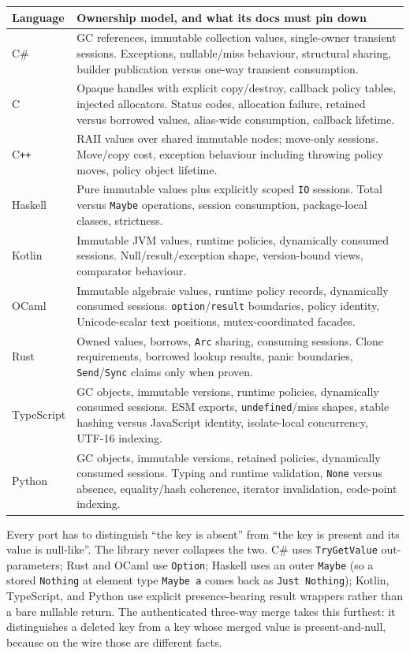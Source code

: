 \documentclass[11pt,twoside,openright]{book}
\makeatletter
\newcommand{\code}[1]{\texorpdfstring{\textcolor{d7ink}{\texttt{#1}}}{#1}}
\newenvironment{d7table}[1]
  {\par\vspace{3pt}\small
   \setlength{\LTpre}{4pt}\setlength{\LTpost}{4pt}
   \begin{longtable}{@{}%
     >{\raggedright\arraybackslash}p{#1\textwidth}%
     @{\hspace{10pt}}%
     >{\raggedright\arraybackslash}p{\dimexpr\textwidth-#1\textwidth-10pt\relax}@{}}}
  {\end{longtable}}
\newcommand{\thead}[1]{\sffamily\bfseries\footnotesize\color{d7ink}#1}
\makeatother
\begin{document}
\begin{d7table}{0.13}
\toprule
\thead{Language} & \thead{Ownership model, and what its docs must pin down} \\
\midrule
C\#         & GC references, immutable collection values, single-owner transient
sessions. Exceptions, nullable/miss behaviour, structural sharing, builder
publication versus one-way transient consumption. \\
C           & Opaque handles with explicit copy/destroy, callback policy tables,
injected allocators. Status codes, allocation failure, retained versus borrowed
values, alias-wide consumption, callback lifetime. \\
C\texttt{++} & RAII values over shared immutable nodes; move-only sessions.
Move/copy cost, exception behaviour including throwing policy moves, policy
object lifetime. \\
Haskell     & Pure immutable values plus explicitly scoped \code{IO} sessions.
Total versus \code{Maybe} operations, session consumption, package-local classes,
strictness. \\
Kotlin      & Immutable JVM values, runtime policies, dynamically consumed
sessions. Null/result/exception shape, version-bound views, comparator behaviour. \\
OCaml       & Immutable algebraic values, runtime policy records, dynamically
consumed sessions. \code{option}/\code{result} boundaries, policy identity,
Unicode-scalar text positions, mutex-coordinated facades. \\
Rust        & Owned values, borrows, \code{Arc} sharing, consuming sessions.
Clone requirements, borrowed lookup results, panic boundaries,
\code{Send}/\code{Sync} claims only when proven. \\
TypeScript  & GC objects, immutable versions, runtime policies, dynamically
consumed sessions. ESM exports, \code{undefined}/miss shapes, stable hashing
versus JavaScript identity, isolate-local concurrency, UTF-16 indexing. \\
Python      & GC objects, immutable versions, retained policies, dynamically
consumed sessions. Typing and runtime validation, \code{None} versus absence,
equality/hash coherence, iterator invalidation, code-point indexing. \\
\bottomrule
\end{d7table}

\begin{caveatbox}
Every port has to distinguish ``the key is absent'' from ``the key is present and
its value is null-like''. The library never collapses the two. C\# uses
\code{TryGetValue} out-parameters; Rust and OCaml use \code{Option}; Haskell uses
an outer \code{Maybe} (so a stored \code{Nothing} at element type \code{Maybe a}
comes back as \code{Just Nothing}); Kotlin, TypeScript, and Python use explicit
presence-bearing result wrappers rather than a bare nullable return. The
authenticated three-way merge takes this furthest: it distinguishes a deleted key
from a key whose merged value is present-and-null, because on the wire those are
different facts.
\end{caveatbox}
\end{document}
